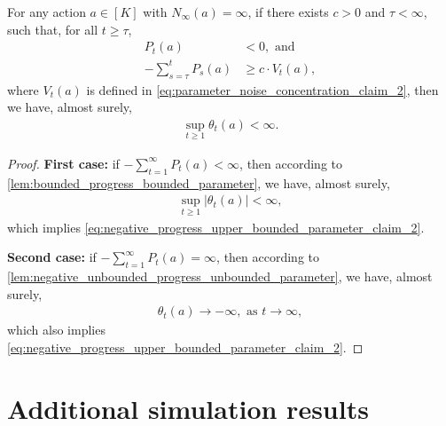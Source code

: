 \begin{lemma}
\label{lem:negative_progress_upper_bounded_parameter}
For any action $a \in [K]$ with $N_\infty(a) = \infty$, if there exists $c > 0$ and $\tau < \infty$, such that, for all $t \ge \tau$,
\begin{align}
\label{eq:negative_progress_upper_bounded_parameter_claim_1a}
    P_t(a) &< 0, \text{ and} \\
\label{eq:negative_progress_upper_bounded_parameter_claim_1b}
    - \sum_{s=\tau}^{t} P_s(a) &\ge c \cdot V_t(a),
\end{align}
where $V_t(a)$ is defined in \cref{eq:parameter_noise_concentration_claim_2}, 
then we have, almost surely,
\begin{align}
\label{eq:negative_progress_upper_bounded_parameter_claim_2}
    \sup_{t \ge 1}{ \theta_t(a) } < \infty.
\end{align}
\end{lemma}
\begin{proof}
\textbf{First case:} if $ - \sum_{t=1}^{\infty} P_t(a) < \infty$, then according to \cref{lem:bounded_progress_bounded_parameter}, we have, almost surely,
\begin{align}
\label{eq:negative_progress_upper_bounded_parameter_proof_1}
    \sup_{t \ge 1}{ |\theta_t(a)| } < \infty,
\end{align}
which implies \cref{eq:negative_progress_upper_bounded_parameter_claim_2}.

\textbf{Second case:} if $- \sum_{t=1}^{\infty} P_t(a) = \infty$, then according to \cref{lem:negative_unbounded_progress_unbounded_parameter}, we have, almost surely,
\begin{align}
\label{eq:negative_progress_upper_bounded_parameter_proof_2}
    \theta_t(a) \to - \infty, \text{ as } t \to \infty,
\end{align}
which also implies \cref{eq:negative_progress_upper_bounded_parameter_claim_2}.
\end{proof}

\section{Additional simulation results}
\label{app:sim}

